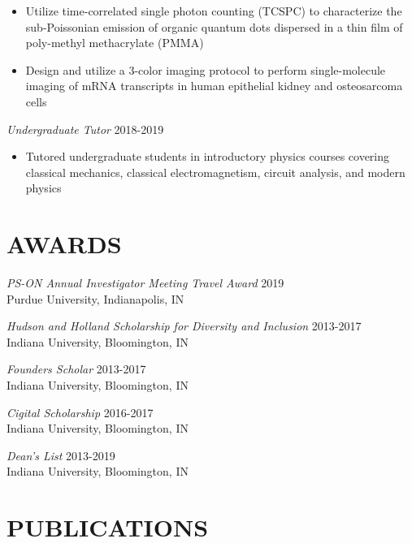 \documentclass[margin, 10pt]{res} %
\begin{document}
\begin{resume}
\begin{itemize}
\item Utilize time-correlated single photon counting (TCSPC) to characterize the sub-Poissonian emission of organic quantum dots dispersed in a thin film of poly-methyl methacrylate (PMMA)

\item Design and utilize a 3-color imaging protocol to perform single-molecule imaging of mRNA transcripts in human epithelial kidney and osteosarcoma cells 

\end{itemize} 


{\sl Undergraduate Tutor} \hfill 2018-2019
\begin{itemize} \itemsep -2pt %

\item Tutored undergraduate students in introductory physics courses covering classical mechanics, classical electromagnetism, circuit analysis, and modern physics

\end{itemize} 


\section{AWARDS}

{\sl PS-ON Annual Investigator Meeting Travel Award} \hfill 2019 \\
Purdue University, Indianapolis, IN 

{\sl Hudson and Holland Scholarship for Diversity and Inclusion} \hfill 2013-2017 \\
Indiana University, Bloomington, IN 

{\sl Founders Scholar} \hfill 2013-2017 \\
Indiana University, Bloomington, IN 

{\sl Cigital Scholarship} \hfill 2016-2017 \\
Indiana University, Bloomington, IN 

{\sl Dean’s List} \hfill 2013-2019 \\
Indiana University, Bloomington, IN 

\section{PUBLICATIONS}


\end{resume}
\end{document}
